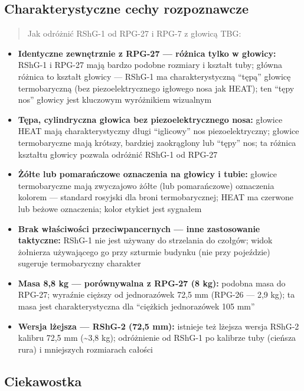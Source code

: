 \documentclass[12pt,oneside]{book}
\providecommand{\tightlist}{%
  \setlength{\itemsep}{0pt}\setlength{\parskip}{0pt}}
\begin{document}
\subsection{Charakterystyczne cechy
rozpoznawcze}\label{charakterystyczne-cechy-rozpoznawcze-91}

\begin{quote}
Jak odróżnić RShG-1 od RPG-27 i RPG-7 z głowicą TBG:
\end{quote}

\begin{itemize}
\tightlist
\item
  \textbf{Identyczne zewnętrznie z RPG-27 --- różnica tylko w głowicy:}
  RShG-1 i RPG-27 mają bardzo podobne rozmiary i kształt tuby; główna
  różnica to kształt głowicy --- RShG-1 ma charakterystyczną ``tępą''
  głowicę termobaryczną (bez piezoelektrycznego igłowego nosa jak HEAT);
  ten ``tępy nos'' głowicy jest kluczowym wyróżnikiem wizualnym
\item
  \textbf{Tępa, cylindryczna głowica bez piezoelektrycznego nosa:}
  głowice HEAT mają charakterystyczny długi ``iglicowy'' nos
  piezoelektryczny; głowice termobaryczne mają krótszy, bardziej
  zaokrąglony lub ``tępy'' nos; ta różnica kształtu głowicy pozwala
  odróżnić RShG-1 od RPG-27
\item
  \textbf{Żółte lub pomarańczowe oznaczenia na głowicy i tubie:} głowice
  termobaryczne mają zwyczajowo żółte (lub pomarańczowe) oznaczenia
  kolorem --- standard rosyjski dla broni termobarycznej; HEAT ma
  czerwone lub beżowe oznaczenia; kolor etykiet jest sygnałem
\item
  \textbf{Brak właściwości przeciwpancernych --- inne zastosowanie
  taktyczne:} RShG-1 nie jest używany do strzelania do czołgów; widok
  żołnierza używającego go przy szturmie budynku (nie przy pojeździe)
  sugeruje termobaryczny charakter
\item
  \textbf{Masa 8,8 kg --- porównywalna z RPG-27 (8 kg):} podobna masa do
  RPG-27; wyraźnie cięższy od jednorazówek 72,5 mm (RPG-26 --- 2,9 kg);
  ta masa jest charakterystyczna dla ``ciężkich jednorazówek 105 mm''
\item
  \textbf{Wersja lżejsza --- RShG-2 (72,5 mm):} istnieje też lżejsza
  wersja RShG-2 kalibru 72,5 mm (\textasciitilde3,8 kg); odróżnienie od
  RShG-1 po kalibrze tuby (cieńsza rura) i mniejszych rozmiarach całości
\end{itemize}

\subsection{Ciekawostka}\label{ciekawostka-91}
\end{document}
